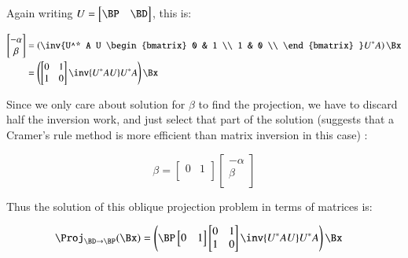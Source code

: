 \documentclass{article}      %
\begin{document}
Again writing $U = 
\begin{bmatrix}
\BP & \BD \\
\end{bmatrix}
$, this is:

\begin{align*}
\begin{bmatrix}
-\alpha \\
\beta \\
\end{bmatrix}
&=
\left(
\inv{U^* A U 
\begin{bmatrix}
0 & 1 \\
1 & 0 \\
\end{bmatrix}
}
U^*
A
\right)
\Bx \\
&=
\left(
\begin{bmatrix}
0 & 1 \\
1 & 0 \\
\end{bmatrix}
\inv{U^* A U 
}
U^*
A
\right)
\Bx \\
\end{align*}

Since we only care about solution for $\beta$ to find the projection, we have to discard half the inversion work, and just select
that part of the solution (suggests that a Cramer's rule method is more efficient than matrix inversion in this case) :

\[
\beta = 
\begin{bmatrix}
0 & 1 \\
\end{bmatrix}
\begin{bmatrix}
-\alpha \\
\beta \\
\end{bmatrix}
\]

Thus the solution of this oblique projection problem in terms of matrices is:

\begin{align*}
\Proj_{\BD \rightarrow \BP}(\Bx) 
&= 
\left(
\BP
\begin{bmatrix}
0 & 1 \\
\end{bmatrix}
\begin{bmatrix}
0 & 1 \\
1 & 0 \\
\end{bmatrix}
\inv{U^* A U 
}
U^*
A
\right)
\Bx
\end{align*}
\end{document}

